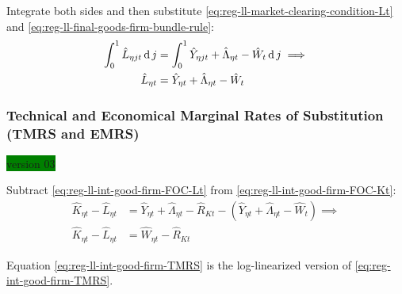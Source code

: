 \documentclass[../thesis.tex]{subfiles}
\begin{document}
Integrate both sides and then substitute \ref{eq:reg-ll-market-clearing-condition-Lt} and \ref{eq:reg-ll-final-goods-firm-bundle-rule}:
\begin{align}
	\int_{0}^{1} \hat{L}_{\eta jt} \operatorname{d} j &= \int_{0}^{1} \hat{Y}_{\eta jt} + \hat{\Lambda}_{\eta t} - \hat{W}_{t} \operatorname{d} j \implies \nonumber \\
	\hat{L}_{\eta t} &= \hat{Y}_{\eta t} + \hat{\Lambda}_{\eta t} - \hat{W}_{t}
	\label{eq:reg-ll-int-good-firm-FOC-Lt}
\end{align}


\subsubsection*{Technical and Economical Marginal Rates of Substitution (TMRS and EMRS)} \colorbox{green}{version 03}

Subtract \ref{eq:reg-ll-int-good-firm-FOC-Lt} from \ref{eq:reg-ll-int-good-firm-FOC-Kt}:
\begin{align}
	\hat{K}_{\eta t} - \hat{L}_{\eta t} &= \hat{Y}_{\eta t} + \hat{\Lambda}_{\eta t} - \hat{R}_{K t} - (\hat{Y}_{\eta t} + \hat{\Lambda}_{\eta t} - \hat{W}_{t}) \implies \nonumber \\
	\hat{K}_{\eta t} - \hat{L}_{\eta t} &= \hat{W}_{\eta t} - \hat{R}_{K t} \label{eq:reg-ll-int-good-firm-TMRS}
\end{align}

Equation \ref{eq:reg-ll-int-good-firm-TMRS} is the log-linearized version of \ref{eq:reg-int-good-firm-TMRS}.


\begin{comment}

\begin{tcolorbox}[colback=red!5!white,colframe=red!75!black]

\subsubsection*{Capital and Labor Levels}
	
	Subtract \ref{eq:reg-ll-int-good-firm-TMRS} of one region from the other:
	\begin{align}
		(\hat{K}_{1t} - \hat{L}_{1t}) - (\hat{K}_{2t} - \hat{L}_{2t}) &= (\hat{W}_{t} - \hat{R}_{K t}) - (\hat{W}_{t} - \hat{R}_{K t}) \implies \nonumber \\
		\hat{K}_{1t} - \hat{L}_{1t} &= \hat{K}_{2t} - \hat{L}_{2t} \label{eq:reg-ll-int-good-firm-TMRS-b}
	\end{align}
	
\end{tcolorbox}

\end{comment}
\end{document}
